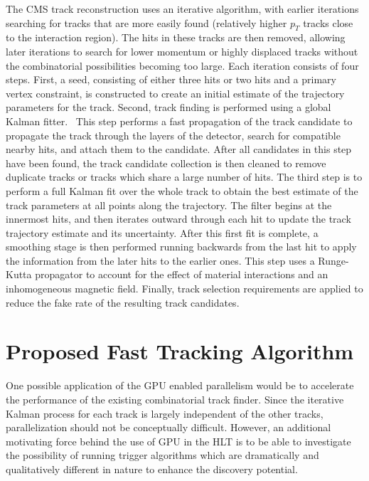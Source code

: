 \documentclass{JINST}
\begin{document}
The CMS track reconstruction uses an iterative algorithm, with earlier iterations searching for tracks that are more easily found 
(relatively higher $p_T$ tracks close to the interaction region). The hits in these tracks are then removed, allowing later iterations 
to search for lower momentum or highly displaced tracks without the combinatorial possibilities becoming too large. Each iteration 
consists of four steps. First, a seed, consisting of either three hits or two hits and a primary vertex constraint, is constructed 
to create an initial estimate of the trajectory parameters for the track. Second, track finding is performed using a global Kalman 
fitter.~\cite{Fruhwirth:1987fm} This step performs a fast propagation of the track candidate to propagate the track through the
 layers of the detector, search for compatible nearby hits, and attach them to the candidate. After all candidates in this step have
 been found, the track candidate collection is then cleaned to remove duplicate tracks or tracks which share a large number of hits. 
The third step is to perform a full Kalman fit over the whole track to obtain the best estimate of the track parameters at all points 
along the trajectory. The filter begins at the innermost hits, and then iterates outward through each hit to update the track trajectory 
estimate and its uncertainty. After this first fit is complete, a smoothing stage is then performed running backwards from the last hit 
to apply the information from the later hits to the earlier ones. This step uses a Runge-Kutta propagator to account for the effect of 
material interactions and an inhomogeneous magnetic field. Finally, track selection requirements are applied to reduce the fake rate of the resulting track candidates.






\section{Proposed Fast Tracking Algorithm}

One possible application of the GPU enabled parallelism would be to
accelerate the performance of the existing combinatorial track finder.
Since the iterative Kalman process for each track is largely independent of the other tracks,
parallelization should not be conceptually difficult. However, an additional motivating 
force behind the use of GPU in the HLT is to be able to investigate the possibility of 
running trigger algorithms which are dramatically and qualitatively different in nature 
to enhance the discovery potential.
\end{document}
